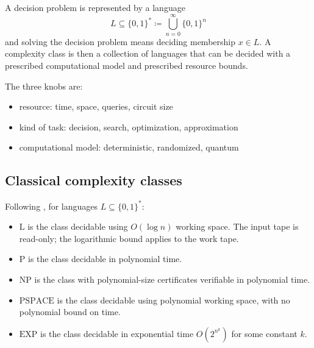 A decision problem is represented by a language
\[
L
\subseteq
\{0,1\}^{*} 
\coloneq
\bigcup_{n=0}^{\infty}\{0,1\}^{n}
\]
and solving the decision problem means deciding membership \(x\in L\).
A complexity class is then a collection of languages that can be decided with a prescribed computational model and prescribed resource bounds.

The three knobs are:
\begin{itemize}
\item
resource: time, space, queries, circuit size
\item
kind of task: decision, search, optimization, approximation
\item
computational model: deterministic, randomized, quantum
\end{itemize}


\subsection{Classical complexity classes}

\begin{definition}\label{def:classical-complexity-reference-classes}
Following \cite{nielsenChuangQCQI}, for languages \(L\subseteq\{0,1\}^{*}\):
\begin{itemize}
\item
\(\mathrm{L}\) is the class decidable using \(O(\log n)\) working space.
The input tape is read-only; the logarithmic bound applies to the work tape.
\item
\(\mathrm{P}\) is the class decidable in polynomial time.
\item
\(\mathrm{NP}\) is the class with polynomial-size certificates verifiable in polynomial time.
\item
\(\mathrm{PSPACE}\) is the class decidable using polynomial working space, with no polynomial bound on time.
\item
\(\mathrm{EXP}\) is the class decidable in exponential time \(O(2^{n^{k}})\) for some constant \(k\).
\qedhere
\end{itemize}
\end{definition}


